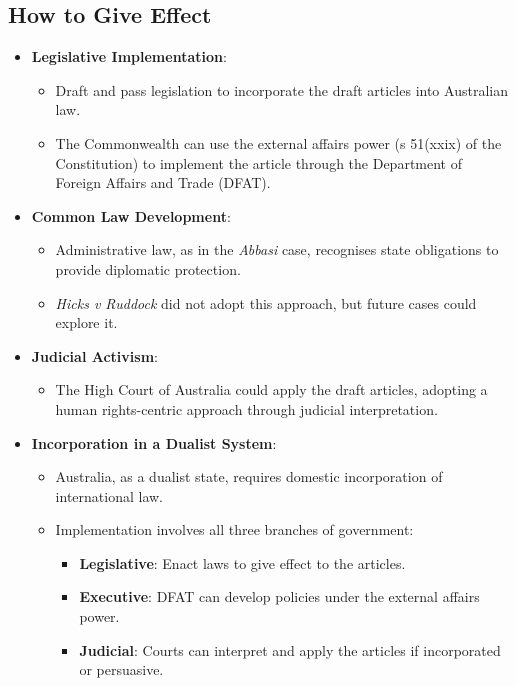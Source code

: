 \subsection{How to Give Effect}
\begin{itemize}
    \item \textbf{Legislative Implementation}:
    \begin{itemize}
        \item Draft and pass legislation to incorporate the draft articles into Australian law.
        \item The Commonwealth can use the external affairs power (s 51(xxix) of the Constitution) to implement the article through the Department of Foreign Affairs and Trade (DFAT).
    \end{itemize}
    \item \textbf{Common Law Development}:
    \begin{itemize}
        \item Administrative law, as in the \textit{Abbasi} case, recognises state obligations to provide diplomatic protection.
        \item \textit{Hicks v Ruddock} did not adopt this approach, but future cases could explore it.
    \end{itemize}
    \item \textbf{Judicial Activism}:
    \begin{itemize}
        \item The High Court of Australia could apply the draft articles, adopting a human rights-centric approach through judicial interpretation.
    \end{itemize}
    \item \textbf{Incorporation in a Dualist System}:
    \begin{itemize}
        \item Australia, as a dualist state, requires domestic incorporation of international law.
        \item Implementation involves all three branches of government:
        \begin{itemize}
            \item \textbf{Legislative}: Enact laws to give effect to the articles.
            \item \textbf{Executive}: DFAT can develop policies under the external affairs power.
            \item \textbf{Judicial}: Courts can interpret and apply the articles if incorporated or persuasive.
        \end{itemize}
    \end{itemize}
\end{itemize}

